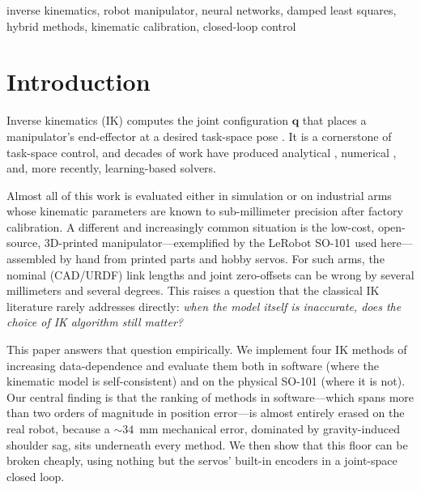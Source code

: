 \documentclass[conference]{IEEEtran}
\begin{document}
\begin{IEEEkeywords}
inverse kinematics, robot manipulator, neural networks, damped least squares, hybrid methods, kinematic calibration, closed-loop control
\end{IEEEkeywords}

\section{Introduction}

Inverse kinematics (IK) computes the joint configuration $\mathbf{q}$ that places a manipulator's end-effector at a desired task-space pose \cite{siciliano2016robotics}. It is a cornerstone of task-space control, and decades of work have produced analytical \cite{craig2005introduction}, numerical \cite{buss2004introduction}, and, more recently, learning-based \cite{duka2014neural, bensadoun2022neural} solvers.

Almost all of this work is evaluated either in simulation or on industrial arms whose kinematic parameters are known to sub-millimeter precision after factory calibration. A different and increasingly common situation is the low-cost, open-source, 3D-printed manipulator---exemplified by the LeRobot SO-101 used here---assembled by hand from printed parts and hobby servos. For such arms, the nominal (CAD/URDF) link lengths and joint zero-offsets can be wrong by several millimeters and several degrees. This raises a question that the classical IK literature rarely addresses directly: \emph{when the model itself is inaccurate, does the choice of IK algorithm still matter?}

This paper answers that question empirically. We implement four IK methods of increasing data-dependence and evaluate them both in software (where the kinematic model is self-consistent) and on the physical SO-101 (where it is not). Our central finding is that the ranking of methods in software---which spans more than two orders of magnitude in position error---is almost entirely erased on the real robot, because a $\sim\!34$~mm mechanical error, dominated by gravity-induced shoulder sag, sits underneath every method. We then show that this floor can be broken cheaply, using nothing but the servos' built-in encoders in a joint-space closed loop.
\end{document}
